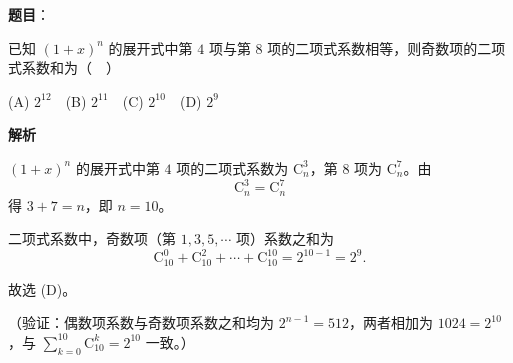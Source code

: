\begin{answer}

\textbf{题目}：

已知 \((1+x)^n\) 的展开式中第 \(4\) 项与第 \(8\) 项的二项式系数相等，则奇数项的二项式系数和为（　）

(A) \(2^{12}\)　(B) \(2^{11}\)　(C) \(2^{10}\)　(D) \(2^9\)

\textbf{解析}

\((1+x)^n\) 的展开式中第 \(4\) 项的二项式系数为 \(\mathrm{C}_n^3\)，第 \(8\) 项为 \(\mathrm{C}_n^7\)。由
\nopagebreak[4]
\[
\mathrm{C}_n^3=\mathrm{C}_n^7
\]
得 \(3+7=n\)，即 \(n=10\)。

二项式系数中，奇数项（第 \(1,3,5,\cdots\) 项）系数之和为
\nopagebreak[4]
\[
\mathrm{C}_{10}^0+\mathrm{C}_{10}^2+\cdots+\mathrm{C}_{10}^{10}=2^{10-1}=2^9.
\]

故选 (D)。

（验证：偶数项系数与奇数项系数之和均为 \(2^{n-1}=512\)，两者相加为 \(1024=2^{10}\)，与 \(\sum_{k=0}^{10}\mathrm{C}_{10}^k=2^{10}\) 一致。）


\end{answer}
